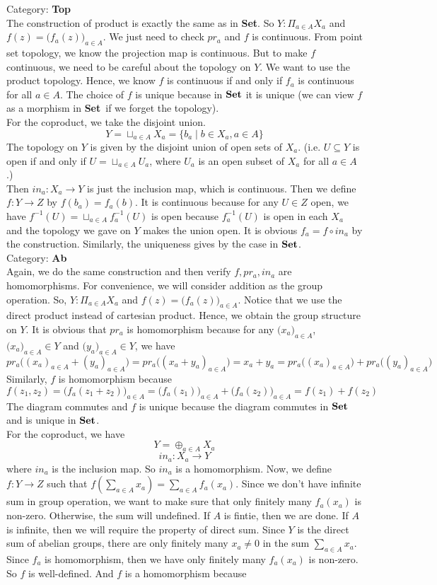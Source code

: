 \documentclass[12pt]{amsart}
\newcommand{\catname}[1]{{\normalfont\textbf{#1}}}
\newcommand{\Set}{\catname{Set}}
\newcommand{\Top}{\catname{Top}}
\newcommand{\Ab}{\catname{Ab}}
\begin{document}
\break
Category: \Top\\
The construction of product is exactly the same as in \Set. So $Y:\Pi_{a\in A}X_a$ and $f(z)=\big(f_a(z)\big)_{a\in A}$. We just need to check $pr_a$ and $f$ is continuous. From point set topology, we know the projection map is continuous. But to make $f$ continuous, we need to be careful about the topology on $Y$. We want to use the product topology. Hence, we know $f$ is continuous if and only if $f_a$ is continuous for all $a\in A$. The choice of $f$ is unique because in $\Set$ it is unique (we can view $f$ as a morphism in \Set \ if we forget the topology).\\
For the coproduct, we take the disjoint union.
\[Y=\sqcup_{a\in A}X_a=\{b_a\mid b\in X_a,a\in A\}\] 
The topology on $Y$ is given by the disjoint union of open sets of $X_a$. (i.e. $U\subseteq Y$ is open if and only if $U=\sqcup_{a\in A}U_a$, where $U_a$ is an open subset of $X_a$ for all $a\in A$.)\\
Then $in_a:X_a\to Y$ is just the inclusion map, which is continuous. Then we define $f:Y\to Z$ by $f(b_a)=f_a(b)$. It is continuous because for any $U\in Z$ open, we have $f^{-1}(U)=\sqcup_{a\in A}f_a^{-1}(U)$ is open because $f_a^{-1}(U)$ is open in each $X_a$ and the topology we gave on $Y$ makes the union open. It is obvious $f_a=f\circ in_a$ by the construction. Similarly, the uniqueness gives by the case in $\Set$.
\\
\break
Category: \Ab\\
Again, we do the same construction and then verify $f,pr_a,in_a$ are homomorphisms. For convenience, we will consider addition as the group operation. So, $Y:\Pi_{a\in A}X_a$ and $f(z)=\big(f_a(z)\big)_{a\in A}$. Notice that we use the direct product instead of cartesian product. Hence, we obtain the group structure on $Y$. It is obvious that $pr_a$ is homomorphism because for any $\big(x_a\big)_{a\in A}$, $\big(x_a\big)_{a\in A}\in Y$ and $\big(y_a\big)_{a\in A}\in Y$, we have 
\[pr_a\big((x_a)_{a\in A}+ (y_a)_{a\in A}\big)=pr_a\big((x_a+y_a)_{a\in A}\big)=x_a+y_a=pr_a\big((x_a)_{a\in A}\big)+ pr_a\big((y_a)_{a\in A}\big)\]
Similarly, $f$ is homomorphism because 
\[f(z_1,z_2)=\big(f_a(z_1+z_2)\big)_{a\in A}=\big(f_a(z_1)\big)_{a\in A}+ \big(f_a(z_2)\big)_{a\in A}=f(z_1)+f(z_2)\]
The diagram commutes and $f$ is unique because the diagram commutes in $\Set$ and is unique in $\Set$.\\
For the coproduct, we have 
\[Y=\oplus_{a\in A}X_a\] 
\[in_a:X_a\to Y\]
where $in_a$ is the inclusion map. So $in_a$ is a homomorphism. Now, we define $f:Y\to Z$ such that $f(\sum_{a\in A} x_a)=\sum_{a\in A}f_a(x_a)$. Since we don't have infinite sum in group operation, we want to make sure that only finitely many $f_a(x_a)$ is non-zero. Otherwise, the sum will undefined. If $A$ is fintie, then we are done. If $A$ is infinite, then we will require the property of direct sum. Since $Y$ is the direct sum of abelian groups, there are only finitely many $x_a\neq 0$ in the sum $\sum_{a\in A}x_a$. Since $f_a$ is homomorphism, then we have only finitely many $f_a(x_a)$ is non-zero. So $f$ is well-defined. And $f$ is a homomorphism because 
\end{document}
